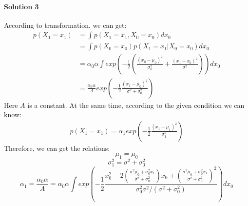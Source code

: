\documentclass[paper=a4, fontsize=11pt]{scrartcl} %
\numberwithin{equation}{section} %
\numberwithin{figure}{section} %
\numberwithin{table}{section} %
\begin{document}
\paragraph{\textbf{Solution 3}}
According to transformation, we can get:
\begin{align*}
p\left ( X_{1}=x_{1} \right )&=\int p\left ( X_{1}=x_{1},X_{0}=x_{0} \right )dx_{0}
\\ &=\int p\left ( X_{0}=x_{0} \right )p\left ( X_{1}=x_{1} |X_{0}=x_{0} \right)dx_{0}
\\ &=\alpha _{0}\alpha \int exp\left ( -\frac{1}{2}\left ( \frac{\left ( x_{0}-\mu _{0} \right )^{2}}{\sigma ^{2}_{0}}+ \frac{\left ( x_{1}-x_{0} \right )^{2}}{\sigma^{2} }\right ) \right )dx_{0}
\\ &=\frac{\alpha _{0}\alpha }{A}exp\left ( -\frac{1}{2}\frac{\left ( x_{1}-\mu _{0} \right )^{2}}{\sigma^{2}+\sigma _{0}^{2}} \right )
\end{align*}
Here $A$ is a constant. At the same time, according to the given condition we can know:
\begin{align*}
p\left ( X_{1}=x_{1} \right )=\alpha _{1}exp\left ( -\frac{1}{2}\frac{\left ( x_{1}-\mu _{1} \right )^{2}}{\sigma _{1}^{2}} \right )
\end{align*}
Therefore, we can get the relations:
\begin{equation*}
\mu _{1}=\mu _{0}
\end{equation*}
\begin{equation*}
\sigma _{1}^{2}=\sigma^{2}+\sigma _{0}^{2}
\end{equation*}
\begin{equation*}
\alpha _{1}=\frac{\alpha _{0}\alpha }{A}=\alpha _{0}\alpha\int exp\left (-\frac{1}{2} \frac{x_{0}^{2}-2\left ( \frac{\sigma ^{2}\mu _{0}+\sigma _{0}^{2}x_{1}}{\sigma ^{2}+\sigma _{0}^{2}} \right )x_{0}+\left ( \frac{\sigma ^{2}\mu _{0}+\sigma _{0}^{2}x_{1}}{\sigma ^{2}+\sigma _{0}^{2}} \right )^{2}}{\sigma _{0}^{2}\sigma^{2} /\left ( \sigma ^{2}+\sigma _{0}^{2} \right )} \right )dx_{0}
\end{equation*}
\end{document}
